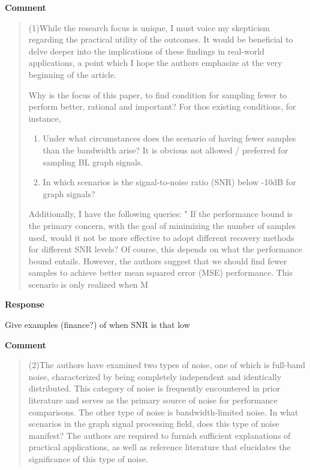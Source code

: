 \documentclass[11pt,onecolumn,journal]{IEEEtran}
\begin{document}
\textbf{Comment}
\begin{quote}
(1)While the research focus is unique, I must voice my skepticism regarding the practical utility of the outcomes. It would be beneficial to delve deeper into the implications of these findings in real-world applications, a point which I hope the authors emphasize at the very beginning of the article. 

Why is the focus of this paper, to find condition for sampling fewer to perform better, rational and important? For thos existing conditions, for instance, 
\begin{enumerate}
    \item Under what circumstances does the scenario of having fewer samples than the bandwidth arise? It is obvious not allowed / preferred for sampling BL graph signals. 
    \item In which scenarios is the signal-to-noise ratio (SNR) below -10dB for graph signals?
\end{enumerate}
Additionally, I have the following queries: 
" If the performance bound is the primary concern, with the goal of minimizing the number of samples used, would it not be more effective to adopt different recovery methods for different SNR levels? Of course, this depends on what the performance bound entails. However, the authors suggest that we should find fewer samples to achieve better mean squared error (MSE) performance. This scenario is only realized when M
\end{quote}

\textbf{Response}
\begin{todolist}
    \item Give examples (finance?) of when SNR is that low
    \item 
\end{todolist}

\textbf{Comment}
\begin{quote}
(2)The authors have examined two types of noise, one of which is full-band noise, characterized by being completely independent and identically distributed. This category of noise is frequently encountered in prior literature and serves as the primary source of noise for performance comparisons. The other type of noise is bandwidth-limited noise. In what scenarios in the graph signal processing field, does this type of noise manifest? The authors are required to furnish sufficient explanations of practical applications, as well as reference literature that elucidates the significance of this type of noise.
\end{quote}
\end{document}
